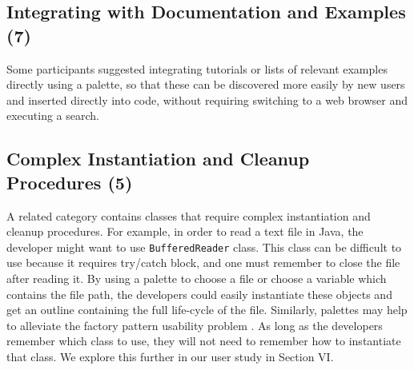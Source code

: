 \documentclass[10pt, conference, compsocconf]{IEEEtran}
\begin{document}
%	

%	


%	

\subsection{Integrating with Documentation and Examples (7)}
Some participants suggested integrating tutorials or lists of relevant examples directly using a palette, so that these can be discovered more easily by new users and inserted directly into code, without requiring switching to a web browser and executing a search.

\subsection{Complex Instantiation and Cleanup Procedures (5)}
A related category contains classes that require complex instantiation and cleanup procedures. For example, in order to read a text file in Java, the developer might want to use \texttt{BufferedReader} class. This class can be difficult to use because it requires try/catch block, and one must remember to close the file after reading it. By using a palette to choose a file or choose a variable which contains the file path, the developers could easily instantiate these objects and get an outline containing the full life-cycle of the file. Similarly, palettes may help to alleviate the factory pattern usability problem \cite{ellis_factory_2007}. As long as the developers remember which class to use, they will not need to remember how to instantiate that class. We explore this further in our user study in Section VI.
\end{document}
